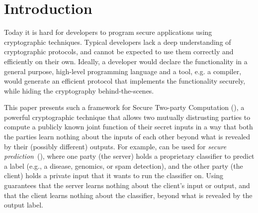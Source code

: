   
  
\vspace{-0.1in}
\section{Introduction}
\label{sec:intro}


 Today it is hard for developers to program secure applications
 using cryptographic techniques. Typical developers lack a deep
 understanding of cryptographic protocols, and cannot be
 expected to use them correctly and efficiently on their own.
 Ideally, a developer would declare the functionality in a general
 purpose, high-level programming language and a
 tool, e.g. a compiler, would generate an efficient protocol that
 implements the functionality securely, while hiding the cryptography
 behind-the-scenes. 
 
 This paper presents such a framework for Secure
 Two-party Computation (\mpc),
%
%
%
a powerful
cryptographic technique that allows two mutually distrusting parties
to compute a publicly known joint function of their secret inputs in a way that both
the parties learn nothing about the inputs of each other beyond what
is revealed by their (possibly different) outputs. For example, \mpc
can be used for {\em secure
prediction}~(\cite{shafindss,wu,barni,minionn,secureml}),
where one party (the server) holds a proprietary classifier to predict
a label (e.g., a disease, genomics, or spam detection), and the other
party (the client) holds a private input that it wants to run the
classifier on. Using \mpc guarantees that the server learns nothing
about the client's input or output, and that the client learns nothing
about the classifier, beyond what is revealed by the output
label.

